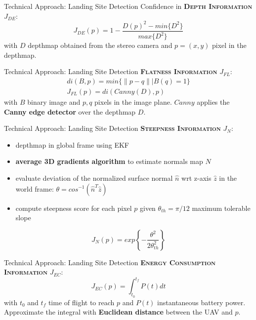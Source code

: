 \documentclass[10pt]{beamer}
\begin{document}
    \begin{frame}{Technical Approach: Landing Site Detection}
        \justifying
        Confidence in \textbf{\textsc{Depth Information}} $J_{DE}$:
        \begin{equation*}
            J_{DE}(p) = 1 - \frac{D(p)^2 - min\{D^2\}}{max\{D^2\}}
        \end{equation*}
        with $D$ depthmap obtained from the stereo camera and $p=(x,y)$
        pixel in the depthmap.
    \end{frame}

    \begin{frame}{Technical Approach: Landing Site Detection}
        \justifying
        \textbf{\textsc{Flatness Information}} $J_{FL}$:
        \begin{gather*}
            di(B, p) = min\Big\{\|p-q\| \Big| B(q)=1\Big\} \\
            J_{FL}(p) = di(Canny(D), p)
        \end{gather*}
        with $B$ binary image and $p, q$ pixels in the image plane. $Canny$
        applies the \textbf{Canny edge detector} over the depthmap $D$.
    \end{frame}

    \begin{frame}{Technical Approach: Landing Site Detection}
        \justifying
        \textbf{\textsc{Steepness Information}} $J_{N}$:
        \begin{itemize}
            \item depthmap in global frame using EKF
            \item \textbf{average 3D gradients algorithm} to estimate normals map $N$
            \item evaluate deviation of the normalized surface normal
                $\hat{n}$ wrt z-axis $\hat{z}$ in the world frame:
                $\theta = cos^{-1}(\hat{n}^T\hat{z})$
            \item compute steepness score for each pixel $p$ given
                $\theta_{th}=\pi/12$ maximum tolerable slope
        \end{itemize}
        \begin{equation*}
            J_N(p) = exp\left\{ -\frac{\theta^2}{2\theta^2_{th}} \right\}
        \end{equation*}
    \end{frame}

    \begin{frame}{Technical Approach: Landing Site Detection}
        \justifying
        \textbf{\textsc{Energy Consumption Information}} $J_{EC}$:
        \begin{equation*}
            J_{EC}(p) = \int_{t_0}^{t_f} P(t)dt
        \end{equation*}
        with $t_0$ and $t_f$ time of flight to reach $p$ and $P(t)$
        instantaneous battery power. Approximate the integral with
        \textbf{Euclidean distance} between the UAV and $p$.
    \end{frame}
\end{document}
